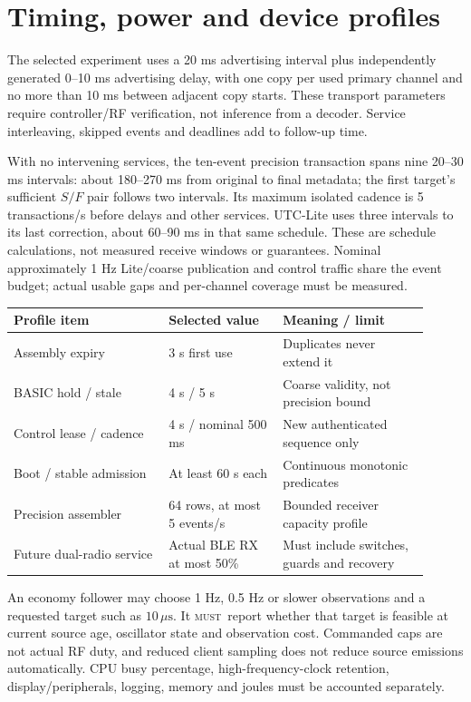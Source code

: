 \documentclass[11pt,letterpaper]{article}
\newcommand{\us}{\,\mu\mathrm{s}}
\newcommand{\page}{\clearpage}
\newcommand{\must}{\textsc{must}}
\begin{document}
\page
\section{Timing, power and device profiles}\label{sec:profiles}
The selected experiment uses a 20 ms advertising interval plus independently generated 0--10 ms advertising delay, with one copy per used primary channel and no more than 10 ms between adjacent copy starts. These transport parameters require controller/RF verification, not inference from a decoder. Service interleaving, skipped events and deadlines add to follow-up time.

With no intervening services, the ten-event precision transaction spans nine 20--30 ms intervals: about 180--270 ms from original to final metadata; the first target's sufficient $S/F$ pair follows two intervals. Its maximum isolated cadence is 5 transactions/s before delays and other services. UTC-Lite uses three intervals to its last correction, about 60--90 ms in that same schedule. These are schedule calculations, not measured receive windows or guarantees. Nominal approximately 1 Hz Lite/coarse publication and control traffic share the event budget; actual usable gaps and per-channel coverage must be measured.

\begin{center}\small
\begin{tabular}{@{}L{0.34\linewidth}L{0.25\linewidth}L{0.32\linewidth}@{}}\toprule
Profile item & Selected value & Meaning / limit \\\midrule
Assembly expiry & 3 s first use & Duplicates never extend it \\
BASIC hold / stale & 4 s / 5 s & Coarse validity, not precision bound \\
Control lease / cadence & 4 s / nominal 500 ms & New authenticated sequence only \\
Boot / stable admission & At least 60 s each & Continuous monotonic predicates \\
Precision assembler & 64 rows, at most 5 events/s & Bounded receiver capacity profile \\
Future dual-radio service & Actual BLE RX at most 50\% & Must include switches, guards and recovery \\\bottomrule
\end{tabular}
\end{center}
An economy follower may choose 1 Hz, 0.5 Hz or slower observations and a requested target such as $10\us$. It \must\ report whether that target is feasible at current source age, oscillator state and observation cost. Commanded caps are not actual RF duty, and reduced client sampling does not reduce source emissions automatically. CPU busy percentage, high-frequency-clock retention, display/peripherals, logging, memory and joules must be accounted separately.
\end{document}
